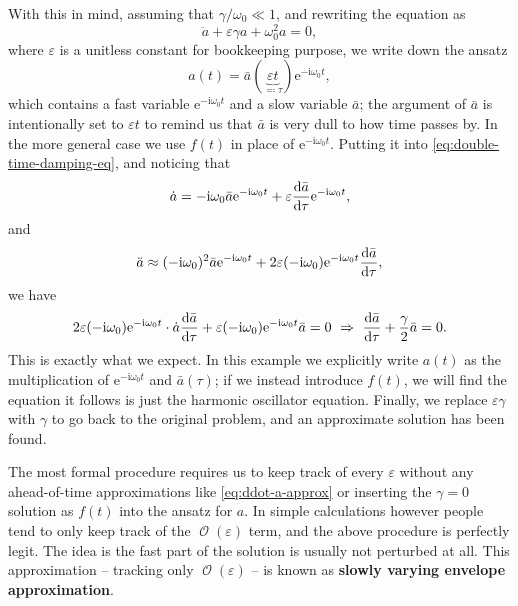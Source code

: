\documentclass[hyperref, a4paper]{article}
\newcommand*{\ii}{\mathrm{i}}
\newcommand*{\ee}{\mathrm{e}}
\DeclareMathOperator{\bigO}{\mathcal{O}}
\newcommand*{\concept}[1]{{\textbf{#1}}}
\begin{document}
With this in mind, assuming that $\gamma / \omega_0 \ll 1$,
and rewriting the equation as 
\begin{equation}
    \ddot{a} + \varepsilon \gamma a + \omega_0^2 a = 0,
    \label{eq:double-time-damping-eq}
\end{equation}
where $\varepsilon$ is a unitless constant 
for bookkeeping purpose,
we write down the ansatz 
\begin{equation}
    a(t) = \bar{a}(
        \underbrace{\varepsilon t}_{\eqqcolon \tau}
    ) \ee^{- \ii \omega_0 t}, 
\end{equation}
which contains a fast variable $\ee^{- \ii \omega_0 t}$
and a slow variable $\bar{a}$;
the argument of $\bar{a}$ is intentionally set to $\varepsilon t$ 
to remind us that $\bar{a}$ is very dull to 
how time passes by.
In the more general case we use $f(t)$ in place of $\ee^{- \ii \omega_0 t}$.
Putting it into \eqref{eq:double-time-damping-eq},
and noticing that 
\begin{equation}
    \dot{a} = - \ii \omega_0 \bar{a} \ee^{- \ii \omega_0 t}
    + \varepsilon \dv{\bar{a}}{\tau} \ee^{- \ii \omega_0 t},
\end{equation}
and 
\begin{equation}
    \ddot{a} \approx (- \ii \omega_0)^2 \bar{a} \ee^{- \ii \omega_0 t} 
    + 2 \varepsilon (- \ii \omega_0) \ee^{- \ii \omega_0 t} \dv{\bar{a}}{\tau},
    \label{eq:ddot-a-approx}
\end{equation}
we have 
\begin{equation}
    2 \varepsilon (- \ii \omega_0) \ee^{- \ii \omega_0 t} \cdot \dot{a} \dv{\bar{a}}{\tau} 
    + \varepsilon (- \ii \omega_0) \ee^{- \ii \omega_0 t} \bar{a} = 0
    \ \Rightarrow \ \dv{\bar{a}}{\tau} + \frac{\gamma}{2} \bar{a} = 0 .
\end{equation}
This is exactly what we expect.
In this example we explicitly write $a(t)$ as the multiplication 
of $\ee^{- \ii \omega_0 t}$ and $\bar{a}(\tau)$; 
if we instead introduce $f(t)$,
we will find the equation it follows 
is just the harmonic oscillator equation.
Finally, we replace $\varepsilon \gamma$ with $\gamma$ 
to go back to the original problem,
and an approximate solution has been found. 

The most formal procedure requires us to keep track of 
every $\varepsilon$ without any ahead-of-time approximations like 
\eqref{eq:ddot-a-approx} or 
inserting the $\gamma = 0$ solution as $f(t)$ into the ansatz for $a$.
In simple calculations however people tend to only keep track of the $\bigO(\varepsilon)$ term,
and the above procedure is perfectly legit.
The idea is the fast part of the solution is usually 
not perturbed at all.
This approximation -- tracking only $\bigO(\varepsilon)$ -- 
is known as \concept{slowly varying envelope approximation}.
\end{document}
